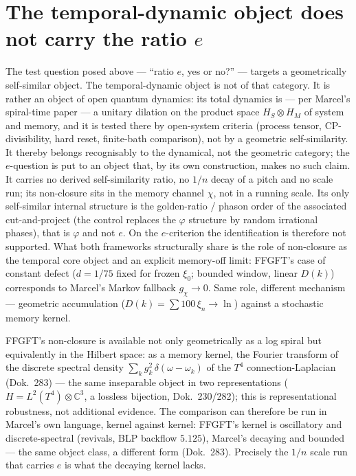 \section{The temporal-dynamic object does not carry the ratio $e$}
The test question posed above --- \enquote{ratio $e$, yes or no?} --- targets a geometrically
self-similar object. The temporal-dynamic object is not of that category. It is rather an object of
open quantum dynamics: its total dynamics is --- per Marcel's spiral-time paper --- a unitary
dilation on the product space $H_S\otimes H_M$ of system and memory, and it is tested there by
open-system criteria (process tensor, CP-divisibility, hard reset, finite-bath comparison), not by
a geometric self-similarity. It thereby belongs recognisably to the dynamical, not the geometric
category; the $e$-question is put to an object that, by its own construction, makes no such claim.
It carries no derived
self-similarity ratio, no $1/n$ decay of a pitch and no scale run; its non-closure sits in the
memory channel $\chi$, not in a running scale. Its only self-similar internal structure is the
golden-ratio / phason order of the associated cut-and-project (the control replaces the $\varphi$
structure by random irrational phases), that is $\varphi$ and not $e$. On the $e$-criterion the
identification is therefore not supported. What both frameworks structurally share is the role of
non-closure as the temporal core object and an explicit memory-off limit: FFGFT's case of
constant defect ($d=1/75$ fixed for frozen $\xi_0$; bounded window, linear $D(k)$) corresponds
to Marcel's Markov fallback $g_\chi\to0$. Same role, different mechanism
--- geometric accumulation ($D(k)=\sum 100\,\xi_n\to\ln$) against a stochastic memory kernel.

FFGFT's non-closure is available not only geometrically as a log spiral but equivalently in the
Hilbert space: as a memory kernel, the Fourier transform of the discrete spectral density
$\sum_k g_k^2\,\delta(\omega-\omega_k)$ of the $T^4$ connection-Laplacian (Dok.~283) --- the same
inseparable object in two representations ($H=L^2(T^4)\otimes\mathbb{C}^3$, a lossless bijection,
Dok.~230/282); this is representational robustness, not additional evidence. The comparison can
therefore be run in Marcel's own language, kernel against kernel: FFGFT's kernel is oscillatory and
discrete-spectral (revivals, BLP backflow $5.125$), Marcel's decaying and bounded --- the same
object class, a different form (Dok.~283). Precisely the $1/n$ scale run that carries $e$ is what
the decaying kernel lacks.

